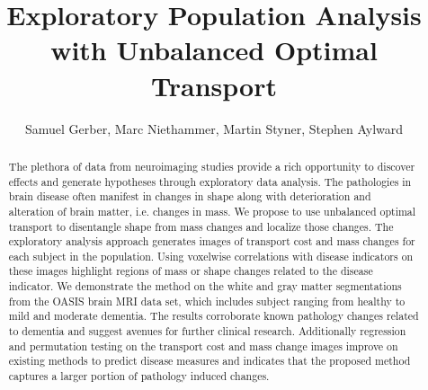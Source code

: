 \documentclass{llncs}
\begin{document}
\title{Exploratory Population Analysis with Unbalanced Optimal Transport}

\author{Samuel Gerber, Marc Niethammer, Martin Styner, Stephen Aylward}


\maketitle              




\begin{abstract}
The plethora of data from neuroimaging studies provide a rich opportunity to
discover effects and generate hypotheses through exploratory data analysis. The
pathologies in brain disease often manifest in changes in shape along with
deterioration and alteration of brain matter, i.e. changes in mass. We propose
to use unbalanced optimal transport to disentangle shape from mass changes and
localize those changes. The exploratory analysis approach generates images of
transport cost and mass changes for each subject in the population.  Using
voxelwise correlations with disease indicators on these images highlight
regions of mass or shape changes related to the disease indicator.  We
demonstrate the method on the white and gray matter segmentations from the
OASIS brain MRI data set, which includes subject ranging from healthy to mild
and moderate dementia. The results corroborate known pathology changes related
to dementia and suggest avenues for further clinical research. Additionally
regression and permutation testing on the transport cost and mass change images
improve on existing methods to predict disease measures and indicates that the
proposed method captures a larger portion of pathology induced changes.
\end{abstract}
\end{document}
